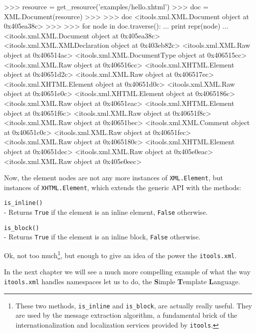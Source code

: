 \begin{code}
    >>> resource = get_resource('examples/hello.xhtml')
    >>> doc = XML.Document(resource)
    >>> 
    >>> doc
    <itools.xml.XML.Document object at 0x405ea38c>
    >>> 
    >>> for node in doc.traverse():
    ...     print repr(node)
    ... 
    <itools.xml.XML.Document object at 0x405ea38c>
    <itools.xml.XML.XMLDeclaration object at 0x403eb82c>
    <itools.xml.XML.Raw object at 0x406514ac>
    <itools.xml.XML.DocumentType object at 0x406515cc>
    <itools.xml.XML.Raw object at 0x406516cc>
    <itools.xml.XHTML.Element object at 0x40651d2c>
    <itools.xml.XML.Raw object at 0x406517ec>
    <itools.xml.XHTML.Element object at 0x40651d0c>
    <itools.xml.XML.Raw object at 0x40651e0c>
    <itools.xml.XHTML.Element object at 0x4065186c>
    <itools.xml.XML.Raw object at 0x40651eac>
    <itools.xml.XHTML.Element object at 0x40651f6c>
    <itools.xml.XML.Raw object at 0x40651f8c>
    <itools.xml.XML.Raw object at 0x40651bec>
    <itools.xml.XML.Comment object at 0x40651c0c>
    <itools.xml.XML.Raw object at 0x40651fec>
    <itools.xml.XML.Raw object at 0x4065180c>
    <itools.xml.XHTML.Element object at 0x40651dec>
    <itools.xml.XML.Raw object at 0x405e0eac>
    <itools.xml.XML.Raw object at 0x405e0eec>
\end{code}

Now, the element nodes are not any more instances of {\tt XML.Element}, but
instances of {\tt XHTML.Element}, which extends the generic API with the
methods:

\begin{api}
    {\tt is\_inline()}\\
    - Returns {\tt True} if the element is an inline element, {\tt False}
    otherwise.

    {\tt is\_block()}\\
    - Returns {\tt True} if the element is an inline block, {\tt False}
    otherwise.
\end{api}

Ok, not too much\footnote{These two methods, {\tt is\_inline} and
{\tt is\_block}, are actually really useful. They are used by the message
extraction algorithm, a fundamental brick of the internationalization and
localization services provided by {\tt itools}.}, but enough to give an
idea of the power the {\tt itools.xml}.

In the next chapter we will see a much more compelling example of what the
way {\tt itools.xml} handles namespaces let us to do, the {\bf S}imple
{\bf T}emplate {\bf L}anguage.


